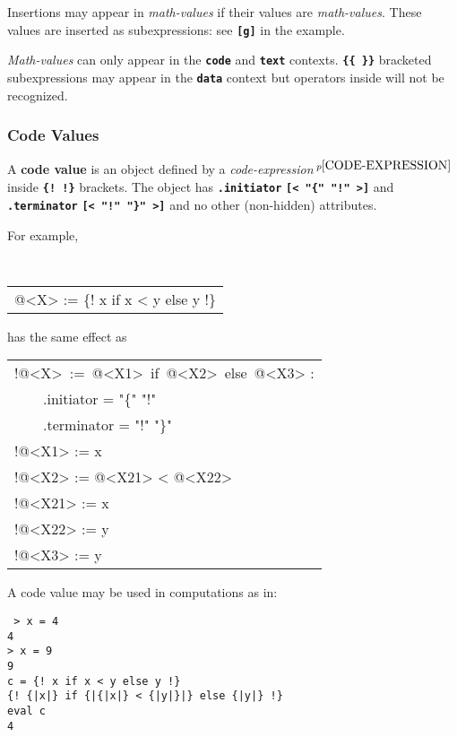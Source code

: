 \documentclass[12pt]{article}
\newcommand{\TT}[1]{{\tt \bfseries #1}}
\newcommand{\key}[1]{{\rm \bfseries #1}}
\newcommand{\pagnote}[1]{$\,^{p\pageref{#1}}$}
\newenvironment{indpar}[1][0.3in]%
	{\begin{list}{}%
		     {\setlength{\itemsep}{0in}%
		      \setlength{\topsep}{0in}%
		      \setlength{\parsep}{1ex}%
		      \setlength{\labelwidth}{#1}%
		      \setlength{\leftmargin}{#1}%
		      \addtolength{\leftmargin}{\labelsep}}%
	 \item}%
	{\end{list}}
\begin{document}
Insertions may appear in {\em math-values} if their values are
{\em math-values}.   These values are inserted as subexpressions:
see \TT{[g]} in the example.

{\em Math-values} can only appear in the \TT{code} and \TT{text}
contexts.  \TT{\{\{~\}\}} bracketed subexpressions may appear in the
\TT{data} context but operators inside will not be recognized.

\subsubsection{Code Values}
\label{CODE-VALUES}

A \key{code value} is an object defined by a
{\em code-expression}\pagnote{CODE-EXPRESSION}
inside \TT{\{!~!\}} brackets.  The object has \TT{.initiator}
\TT{[< "\{" "!" >]} and \TT{.terminator}
\TT{[< "!" "\}" >]} and no other (non-hidden) attributes.

For example,
\begin{indpar}
\tt
\begin{tabular}{l}
@<X> := \{! x if x < y else y !\}
\end{tabular}
\end{indpar}
{\rm has the same effect as}
\begin{indpar}
\begin{tabular}{l}
!@<X>~:=~@<X1>~if~@<X2>~else~@<X3> : \\
~~~~.initiator = "\{" "!" \\
~~~~.terminator = "!" "\}" \\
!@<X1> := x \\
!@<X2> := @<X21> < @<X22> \\
!@<X21> := x \\
!@<X22> := y \\
!@<X3> := y \\
\end{tabular}
\end{indpar}

A code value may be used in computations as in:
\begin{indpar}
\tt
> x = 4 \\
4 \\
> x = 9 \\
9 \\
c = \{!~x if x < y else y !\} \\
\{!~\{|x|\} if \{|\{|x|\} < \{|y|\}|\} else \{|y|\} !\} \\
eval c \\
4
\end{indpar}
\end{document}
